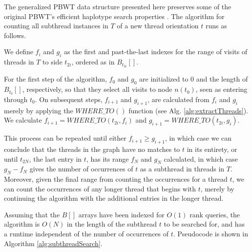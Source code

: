 The generalized PBWT data structure presented here preserves some of the original PBWT's efficient haplotype search properties \cite{durbin2014efficient}. The algorithm for counting all subthread instances in $T$ of a new thread orientation $t$ runs as follows.

We define $f_i$ and $g_i$ as the first and past-the-last indexes for the range of visits of threads in $T$ to side $t_{2i}$, ordered as in $B_{t_{2i}}[]$.

For the first step of the algorithm, $f_0$ and $g_0$ are initialized to $0$ and the length of $B_{t_0}[]$, respectively, so that they select all visits to node $n(t_0)$, seen as entering through $t_0$. On subsequent steps, $f_{i+1}$ and $g_{i+1}$, are calculated from $f_i$ and $g_i$ merely by applying the $WHERE\_TO()$ function (see Alg. \ref{alg:extractThreads}). We calculate $f_{i+1} = WHERE\_TO(t_{2i}, f_i)$ and $g_{i+1} = WHERE\_TO(t_{2i}, g_i)$.

This process can be repeated until either $f_{i+1} \geq g_{i+1}$, in which case we can conclude that the threads in the graph have no matches to $t$ in its entirety, or until $t_{2N}$, the last entry in $t$, has its range $f_N$ and $g_N$ calculated, in which case $g_N - f_N$ gives the number of occurrences of $t$ as a subthread in threads in $T$. Moreover, given the final range from counting the occurrences for a thread $t$, we can count the occurrences of any longer thread that begins with $t$, merely by continuing the algorithm with the additional entries in the longer thread.

Assuming that the $B[]$ arrays have been indexed for $O(1)$ rank queries, the algorithm is $O(N)$ in the length of the subthread $t$ to be searched for, and has a runtime independent of the number of occurrences of $t$. Pseudocode is shown in Algorithm \ref{alg:subthreadSearch}.

